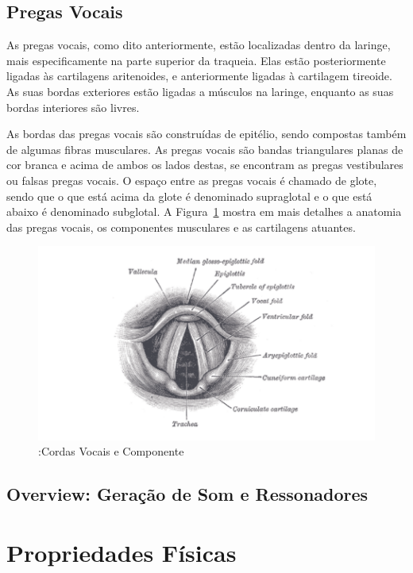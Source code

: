 	\subsection{Pregas Vocais}
	As pregas vocais, como dito anteriormente, estão localizadas dentro da laringe, mais especiﬁcamente na parte superior da traqueia. Elas estão posteriormente ligadas às cartilagens aritenoides, e anteriormente ligadas à cartilagem tireoide. As suas bordas exteriores estão ligadas a músculos na laringe, enquanto as suas bordas interiores são livres.
	
	As bordas das pregas vocais são construídas de epitélio, sendo compostas também de algumas ﬁbras musculares. As pregas vocais são bandas triangulares planas de cor branca e acima de ambos os lados destas, se encontram as pregas vestibulares ou falsas pregas vocais. O espaço entre as pregas vocais é chamado de glote, sendo que o que está acima da glote é denominado supraglotal e o que está abaixo é denominado subglotal. A Figura~\ref{fig:cordasVocais} mostra em mais detalhes a anatomia das pregas vocais, os componentes musculares e as cartilagens atuantes.
	
	\begin{figure}
		\centering
		\includegraphics[scale=0.5]{cordasVocais}
		\caption{:Cordas Vocais e Componente~\cite{Bell}}
		\label{fig:cordasVocais}
	\end{figure}	
	
	\subsection{Overview: Geração de Som e Ressonadores}
	
	
\section{Propriedades Físicas}

